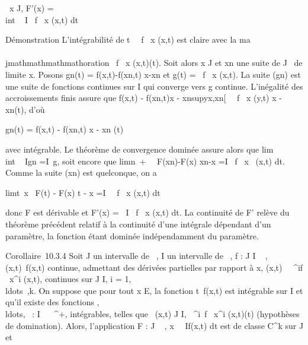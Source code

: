 \forall~x \in J, F'(x) =\\int ~
I \partial~f \over \partial~x (x,t) dt

Démonstration L'intégrabilité de t\mapsto~ \partial~f
\over \partial~x (x,t) est claire avec la ma\\\\jmathmathmathmathoration
\textbar{} \partial~f \over \partial~x (x,t)\textbar{}\leq \phi(t). Soit
alors x \in J et xn une suite de J
\diagdown\x\ de limite x. Posons
gn(t) = f(x,t)-f(xn,t) \over
x-xn et g(t) = \partial~f \over \partial~x (x,t). La
suite (gn) est une suite de fonctions continues sur I qui
converge vers g continue. L'inégalité des accroissements finis assure
que \textbar{}f(x,t) - f(xn,t)\textbar{}\leq\textbar{}x -
xn\textbar{}supy\in{]}x,xn{[}~\left
\textbar{} \partial~f \over \partial~x (y,t)\right
\textbar{}\leq\textbar{}x - xn\textbar{}\phi(t), d'où

\textbar{}gn(t)\textbar{} = \left \textbar{}
f(x,t) - f(xn,t) \over x - xn
\right \textbar{}\leq \phi(t)

avec \phi intégrable. Le théorème de convergence dominée assure alors que
lim\\int ~
Ign =\int  I~g, soit
encore que limn\rightarrow~+\infty~~
F(xn)-F(x) \over xn-x
=\int  I \partial~f \over \partial~x~
(x,t) dt. Comme la suite (xn) est quelconque, on a

limt\rightarrow~x~ F(t) - F(x)
\over t - x =\int  I~
\partial~f \over \partial~x (x,t) dt

donc F est dérivable et F'(x) =\int ~
I \partial~f \over \partial~x (x,t) dt. La continuité de F'
relève du théorème précédent relatif à la continuité d'une intégrale
dépendant d'un paramètre, la fonction étant dominée indépendamment du
paramètre.

Corollaire~10.3.4 Soit J un intervalle de ~, I un intervalle de ~, f : J
\times I \rightarrow~ , (x,t)\mapsto~f(x,t) continue, admettant des
dérivées partielles par rapport à x, (x,t)\mapsto~
\partial~^if \over \partial~x^i (x,t), continues
sur J \times I, i =
1,\\ldots~,k. On
suppose que pour tout x \in E, la fonction
t\mapsto~f(x,t) est intégrable sur I et qu'il existe
des fonctions
,\\ldots,\phik~
: I \rightarrow~ ~^+, intégrables, telles que
\forall~(x,t) \in J \times I, \textbar{} \partial~^i~f
\over \partial~x^i (x,t)\textbar{}\leq \phii(t)
(hypothèses de domination). Alors, l'application F : J \rightarrow~ ,
x\mapsto~\int ~
If(x,t) dt est de classe C^k sur J et

